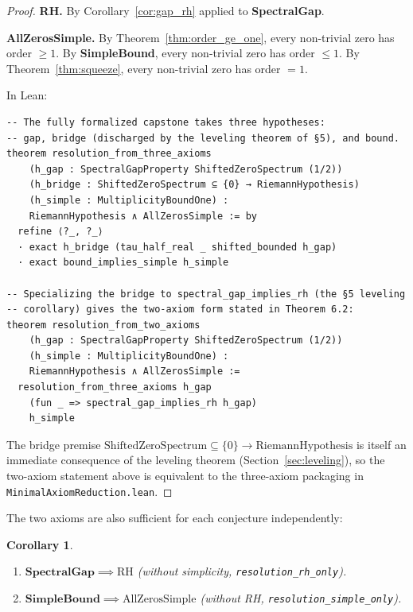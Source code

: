 \documentclass[12pt, a4paper]{article}
\theoremstyle{plain}
\newtheorem{corollary}[theorem]{Corollary}
\theoremstyle{definition}
\newcommand{\lean}[1]{\texttt{#1}}
\newcommand{\RH}{\mathrm{RH}}
\begin{document}
\begin{proof}
\textbf{RH.} By Corollary~\ref{cor:gap_rh} applied to \textbf{SpectralGap}.

\textbf{AllZerosSimple.} By Theorem~\ref{thm:order_ge_one},
every non-trivial zero has order $\geq 1$.
By \textbf{SimpleBound}, every non-trivial zero has order $\leq 1$.
By Theorem~\ref{thm:squeeze}, every non-trivial zero has order $= 1$.

In Lean:
\begin{lstlisting}[language=Lean4]
-- The fully formalized capstone takes three hypotheses:
-- gap, bridge (discharged by the leveling theorem of §5), and bound.
theorem resolution_from_three_axioms
    (h_gap : SpectralGapProperty ShiftedZeroSpectrum (1/2))
    (h_bridge : ShiftedZeroSpectrum ⊆ {0} → RiemannHypothesis)
    (h_simple : MultiplicityBoundOne) :
    RiemannHypothesis ∧ AllZerosSimple := by
  refine ⟨?_, ?_⟩
  · exact h_bridge (tau_half_real _ shifted_bounded h_gap)
  · exact bound_implies_simple h_simple

-- Specializing the bridge to spectral_gap_implies_rh (the §5 leveling
-- corollary) gives the two-axiom form stated in Theorem 6.2:
theorem resolution_from_two_axioms
    (h_gap : SpectralGapProperty ShiftedZeroSpectrum (1/2))
    (h_simple : MultiplicityBoundOne) :
    RiemannHypothesis ∧ AllZerosSimple :=
  resolution_from_three_axioms h_gap
    (fun _ => spectral_gap_implies_rh h_gap)
    h_simple
\end{lstlisting}
The bridge premise $\mathrm{ShiftedZeroSpectrum} \subseteq \{0\} \to \mathrm{RiemannHypothesis}$
is itself an immediate consequence of the leveling theorem
(Section~\ref{sec:leveling}), so the two-axiom statement above is
equivalent to the three-axiom packaging in
\lean{MinimalAxiomReduction.lean}.
\end{proof}

The two axioms are also sufficient for each conjecture independently:

\begin{corollary}
\label{cor:independent}
\begin{enumerate}[label=(\alph*)]
  \item $\mathbf{SpectralGap} \implies \RH$
        (without simplicity, \lean{resolution\_rh\_only}).
  \item $\mathbf{SimpleBound} \implies \mathrm{AllZerosSimple}$
        (without RH, \lean{resolution\_simple\_only}).
\end{enumerate}
\end{corollary}
\end{document}
